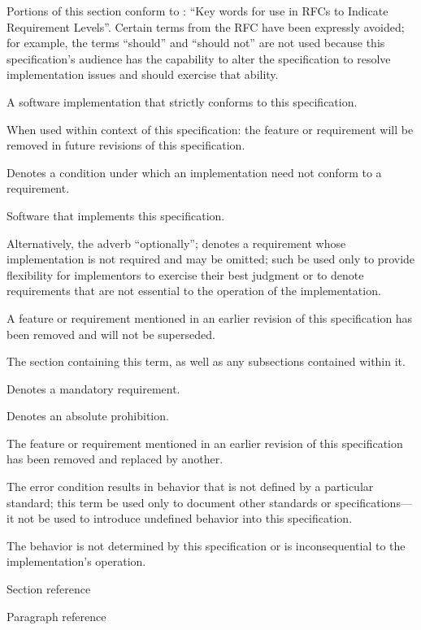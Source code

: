 %

Portions of this section conform to : ``Key words for use in RFCs to
Indicate Requirement Levels''. Certain terms from the RFC have been expressly
avoided; for example, the terms ``should'' and ``should not'' are not used
because this specification's audience has the capability to alter the
specification to resolve implementation issues and should exercise that ability.

\begin{description}
  A software implementation that strictly conforms to this specification.

  When used within context of this specification: the feature or requirement
  will be removed in future revisions of this specification.

  Denotes a condition under which an implementation need not conform to a
  requirement.

  Software that implements this specification.

  Alternatively, the adverb ``optionally''; denotes a requirement whose
  implementation is not required and may be omitted; such \shall be used only to
  provide flexibility for implementors to exercise their best judgment or to
  denote requirements that are not essential to the operation of the
  implementation.

  A feature or requirement mentioned in an earlier revision of this
  specification has been removed and will not be superseded.

  The section containing this term, as well as any subsections contained within
  it.

  Denotes a mandatory requirement.

  Denotes an absolute prohibition.

  The feature or requirement mentioned in an earlier revision of this
  specification has been removed and replaced by another.

  The error condition results in behavior that is not defined by a particular
  standard; this term \shall be used only to document other standards or
  specifications---it \shall not be used to introduce undefined behavior into
  this specification.

  The behavior is not determined by this specification or is inconsequential to
  the implementation's operation.

  \dt{\S}
  Section reference

  \dt{\P}
  Paragraph reference
\end{description}
